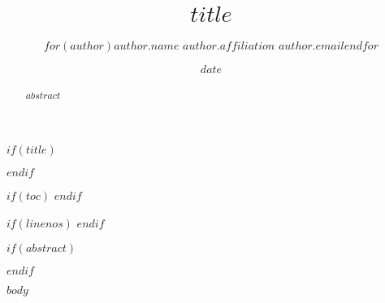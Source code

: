 \documentclass[$if(lang)$$lang$,$endif$]{tufte-handout}
\title{$title$}
\author{$for(author)$\Large $author.name$\vspace{0.05in} \newline\normalsize $author.affiliation$ \newline\footnotesize $author.email$\vspace*{0.2in}\newline $endfor$}
\date{$date$}
\begin{document}
$if(title)$
\maketitle
$endif$

$if(toc)$
{
\hypersetup{linkcolor=black}
\setcounter{tocdepth}{$toc-depth$}
\tableofcontents
}
$endif$

$if(linenos)$
\linenumbers
$endif$

$if(abstract)$
\begin{abstract}
\noindent $abstract$
\end{abstract}
$endif$

$body$



\end{document}
